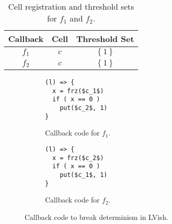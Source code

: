\begin{table}
  \centering
  \begin{tabular}{c|c|c}
    Callback & Cell & Threshold Set \\
    \hline
    $f_1$ & $c$ & $\left\{ 1 \right\}$ \\
    $f_2$ & $c$ & $\left\{ 1 \right\}$ \\
  \end{tabular}
  \caption{Cell registration and threshold sets for $f_1$ and $f_2$.}
  \label{tab:cellreg}
\end{table}
\begin{figure}
  \centering
  \begin{subfigure}[t]{0.4\textwidth}
    \begin{lstlisting}[mathescape=true]
(l) => {
  x = frz($c_1$)
  if ( x == 0 )
    put($c_2$, 1)
}
    \end{lstlisting}
    \caption{Callback code for $f_1$.}
  \end{subfigure}
  \quad
  \begin{subfigure}[t]{0.4\textwidth}
    \begin{lstlisting}[mathescape=true]
(l) => {
  x = frz($c_2$)
  if ( x == 0 )
    put($c_1$, 1)
}
    \end{lstlisting}
    \caption{Callback code for $f_2$.}
  \end{subfigure}
  \caption{Callback code to break determinism in LVish.}
  \label{fig:lvish_fun_breaking}
\end{figure}

